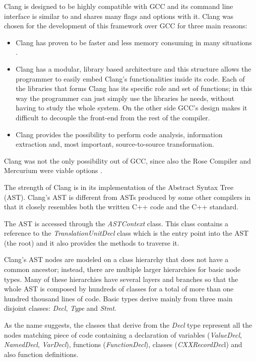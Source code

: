 \documentclass[a4paper,11pt,oneside]{book}
\begin{document}
Clang is designed to be highly compatible with GCC and its command line interface is similar to and shares many flags and options with it. Clang was chosen for the development of this framework over GCC for three main reasons:
\begin{itemize}
 \item Clang has proven to be faster and less memory consuming in many situations \cite{clanggcc}. 
 \item Clang has a modular, library based architecture and this structure allows the programmer to easily embed Clang’s functionalities inside its code. Each of the libraries that forms Clang has its specific role and set of functions; in this way the programmer can just simply use the libraries he needs, without having to study the whole system. On the other side GCC's design makes it difficult to decouple the front-end from the rest of the compiler.
 \item Clang provides the possibility to perform code analysis, information extraction and, most important, source-to-source transformation.
\end{itemize}

Clang was not the only possibility out of GCC, since also the Rose Compiler and Mercurium were viable options \cite{rose}. 

The strength of Clang is in its implementation of the Abstract Syntax Tree (AST). Clang’s AST is different from ASTs produced by some other compilers in that it closely resembles both the written C++ code and the C++ standard.

The AST is accessed through the \emph{ASTContext} class. This class contains a reference to the \emph{TranslationUnitDecl} class which is the entry point into the AST (the root) and it also provides the methods to traverse it.

Clang’s AST nodes are modeled on a class hierarchy that does not have a common ancestor; instead, there are multiple larger hierarchies for basic node types. Many of these hierarchies have several layers and branches so that the whole AST is composed by hundreds of classes for a total of more than one hundred thousand lines of code. Basic types derive mainly from three main disjoint classes: \emph{Decl}, \emph{Type} and \emph{Stmt}. 

As the name suggests, the classes that derive from the \emph{Decl} type represent all the nodes matching piece of code containing a declaration of variables (\emph{ValueDecl}, \emph{NamedDecl}, \emph{VarDecl}), functions (\emph{FunctionDecl}), classes (\emph{CXXRecordDec}l) and also function definitions.
\end{document}
